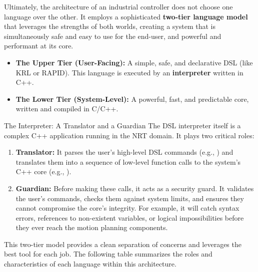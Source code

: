 Ultimately, the architecture of an industrial controller does not choose one language over the other. It employs a sophisticated \textbf{two-tier language model} that leverages the strengths of both worlds, creating a system that is simultaneously safe and easy to use for the end-user, and powerful and performant at its core.

\begin{itemize}
    \item \textbf{The Upper Tier (User-Facing):} A simple, safe, and declarative DSL (like KRL or RAPID). This language is executed by an \textbf{interpreter} written in C++.
    \item \textbf{The Lower Tier (System-Level):} A powerful, fast, and predictable core, written and compiled in C/C++.
\end{itemize}

\begin{tipbox}{The Interpreter: A Translator and a Guardian}
    The DSL interpreter itself is a complex C++ application running in the NRT domain. It plays two critical roles:
    \begin{enumerate}
        \item \textbf{Translator:} It parses the user's high-level DSL commands (e.g., ) and translates them into a sequence of low-level function calls to the system's C++ core (e.g., ).
        \item \textbf{Guardian:} Before making these calls, it acts as a security guard. It validates the user's commands, checks them against system limits, and ensures they cannot compromise the core's integrity. For example, it will catch syntax errors, references to non-existent variables, or logical impossibilities before they ever reach the motion planning components.
    \end{enumerate}
\end{tipbox}

This two-tier model provides a clean separation of concerns and leverages the best tool for each job. The following table summarizes the roles and characteristics of each language within this architecture.

